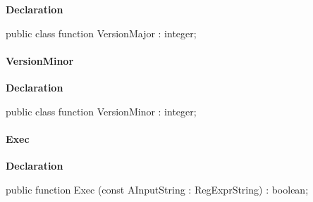 \documentclass{report}
\newif\ifpdf
\begin{document}
\label{RegExpr.TRegExpr-VersionMajor}
\begin{list}{}{
\setlength{\itemindent}{0cm}
\setlength{\listparindent}{0cm}
\setlength{\leftmargin}{\evensidemargin}
\addtolength{\leftmargin}{\tmplength}
\settowidth{\labelsep}{X}
\addtolength{\leftmargin}{\labelsep}
\setlength{\labelwidth}{\tmplength}
}
\item[\textbf{Declaration}\hfill]
\ifpdf
\begin{flushleft}
\fi
\begin{ttfamily}
public class function VersionMajor : integer;\end{ttfamily}

\ifpdf
\end{flushleft}
\fi

\end{list}
\paragraph*{VersionMinor}\hspace*{\fill}

\label{RegExpr.TRegExpr-VersionMinor}
\begin{list}{}{
\setlength{\itemindent}{0cm}
\setlength{\listparindent}{0cm}
\setlength{\leftmargin}{\evensidemargin}
\addtolength{\leftmargin}{\tmplength}
\settowidth{\labelsep}{X}
\addtolength{\leftmargin}{\labelsep}
\setlength{\labelwidth}{\tmplength}
}
\item[\textbf{Declaration}\hfill]
\ifpdf
\begin{flushleft}
\fi
\begin{ttfamily}
public class function VersionMinor : integer;\end{ttfamily}

\ifpdf
\end{flushleft}
\fi

\end{list}
\paragraph*{Exec}\hspace*{\fill}

\label{RegExpr.TRegExpr-Exec}
\begin{list}{}{
\setlength{\itemindent}{0cm}
\setlength{\listparindent}{0cm}
\setlength{\leftmargin}{\evensidemargin}
\addtolength{\leftmargin}{\tmplength}
\settowidth{\labelsep}{X}
\addtolength{\leftmargin}{\labelsep}
\setlength{\labelwidth}{\tmplength}
}
\item[\textbf{Declaration}\hfill]
\ifpdf
\begin{flushleft}
\fi
\begin{ttfamily}
public function Exec (const AInputString : RegExprString) : boolean;\end{ttfamily}

\ifpdf
\end{flushleft}
\fi

\end{list}
\end{document}
